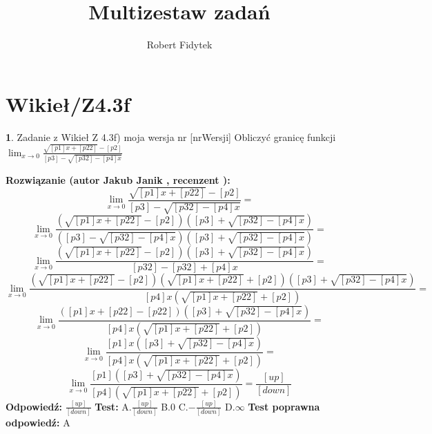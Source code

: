 \documentclass[12pt, a4paper]{article}
\title{Multizestaw zadań}
\author{Robert Fidytek}
\date{}
\theoremstyle{definition} %
\newtheorem{zad}{}
\newcommand{\kategoria}[1]{\section{#1}} %
\newcommand{\zadStart}[1]{\begin{zad}#1\newline} %
\newcommand{\zadStop}{\end{zad}}   %
\newcommand{\rozwStart}[2]{\noindent \textbf{Rozwiązanie (autor #1 , recenzent #2): }\newline} %
\newcommand{\rozwStop}{\newline}                                            %
\newcommand{\odpStart}{\noindent \textbf{Odpowiedź:}\newline}    %
\newcommand{\odpStop}{\newline}                                             %
\newcommand{\testStart}{\noindent \textbf{Test:}\newline} %
\newcommand{\testStop}{\newline} %
\newcommand{\kluczStart}{\noindent \textbf{Test poprawna odpowiedź:}\newline} %
\newcommand{\kluczStop}{\newline} %
\begin{document}
\maketitle


\kategoria{Wikieł/Z4.3f}
\zadStart{Zadanie z Wikieł Z 4.3f) moja wersja nr [nrWersji]}
Obliczyć granicę funkcji $\lim_{x \to 0} \frac{\sqrt{[p1]x + [p22]}-[p2]}{[p3]-\sqrt{[p32]-[p4]x}}$
\zadStop
\rozwStart{Jakub Janik}{}
$$\lim_{x \to 0} \frac{\sqrt{[p1]x + [p22]}-[p2]}{[p3]-\sqrt{[p32]-[p4]x}}=$$
$$\lim_{x \to 0} \frac{(\sqrt{[p1]x + [p22]}-[p2])([p3]+\sqrt{[p32]-[p4]x})}{([p3]-\sqrt{[p32]-[p4]x})([p3]+\sqrt{[p32]-[p4]x})}=$$
$$\lim_{x \to 0} \frac{(\sqrt{[p1]x + [p22]}-[p2])([p3]+\sqrt{[p32]-[p4]x})}{[p32]-[p32]+[p4]x}=$$
$$\lim_{x \to 0} \frac{(\sqrt{[p1]x + [p22]}-[p2])(\sqrt{[p1]x + [p22]}+[p2])([p3]+\sqrt{[p32]-[p4]x})}{[p4]x(\sqrt{[p1]x + [p22]}+[p2])}=$$
$$\lim_{x \to 0} \frac{([p1]x+[p22]-[p22])([p3]+\sqrt{[p32]-[p4]x})}{[p4]x(\sqrt{[p1]x + [p22]}+[p2])}=$$
$$\lim_{x \to 0} \frac{[p1]x([p3]+\sqrt{[p32]-[p4]x})}{[p4]x(\sqrt{[p1]x + [p22]}+[p2])}=$$
$$\lim_{x \to 0} \frac{[p1]([p3]+\sqrt{[p32]-[p4]x})}{[p4](\sqrt{[p1]x + [p22]}+[p2])}=\frac{[up]}{[down]}$$
\rozwStop
\odpStart
$\frac{[up]}{[down]}$
\odpStop
\testStart
A.$\frac{[up]}{[down]}$
B.$0$
C.$-\frac{[up]}{[down]}$
D.$\infty$
\testStop
\kluczStart
A
\kluczStop
\end{document}
